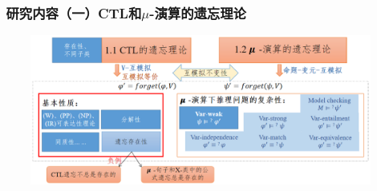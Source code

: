 \documentclass[aspectratio=1610, 9pt, CJK]{beamer}
\begin{document}
\begin{frame}  
	\frametitle{~研究内容（一）CTL和$\mu$-演算的遗忘理论}
	\begin{figure}
		\includegraphics[scale=0.45]{figures/ctlMuForgFrame21}
	\end{figure}
\end{frame}
\end{document}
